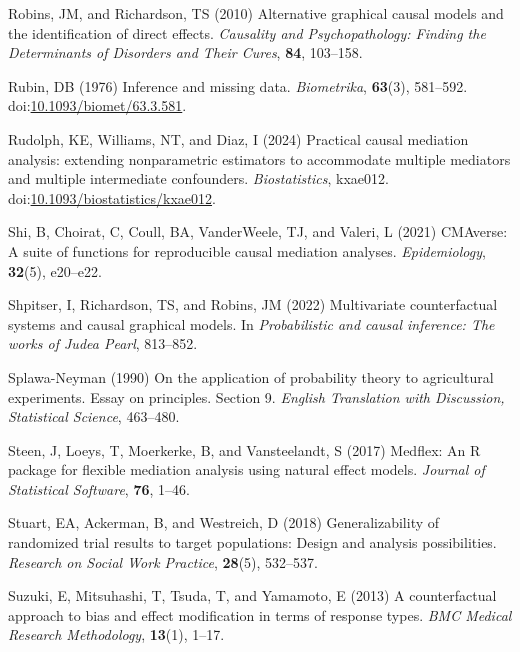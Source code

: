 \documentclass[
  single column]{article}
\newlength{\cslhangindent}
\newenvironment{CSLReferences}[2] %
 {\begin{list}{}{%
  \setlength{\itemindent}{0pt}
  \setlength{\leftmargin}{0pt}
  \setlength{\parsep}{0pt}
  \ifodd #1
   \setlength{\leftmargin}{\cslhangindent}
   \setlength{\itemindent}{-1\cslhangindent}
  \fi
  \setlength{\itemsep}{#2\baselineskip}}}
 {\end{list}}
\begin{document}
\begin{CSLReferences}{1}{0}
Robins, JM, and Richardson, TS (2010) Alternative graphical causal
models and the identification of direct effects. \emph{Causality and
Psychopathology: Finding the Determinants of Disorders and Their Cures},
\textbf{84}, 103--158.

Rubin, DB (1976) Inference and missing data. \emph{Biometrika},
\textbf{63}(3), 581--592.
doi:\href{https://doi.org/10.1093/biomet/63.3.581}{10.1093/biomet/63.3.581}.

Rudolph, KE, Williams, NT, and Diaz, I (2024) {Practical causal
mediation analysis: extending nonparametric estimators to accommodate
multiple mediators and multiple intermediate confounders}.
\emph{Biostatistics}, kxae012.
doi:\href{https://doi.org/10.1093/biostatistics/kxae012}{10.1093/biostatistics/kxae012}.

Shi, B, Choirat, C, Coull, BA, VanderWeele, TJ, and Valeri, L (2021)
CMAverse: A suite of functions for reproducible causal mediation
analyses. \emph{Epidemiology}, \textbf{32}(5), e20--e22.

Shpitser, I, Richardson, TS, and Robins, JM (2022) Multivariate
counterfactual systems and causal graphical models. In
\emph{Probabilistic and causal inference: The works of {J}udea {P}earl},
813--852.

Splawa-Neyman (1990) On the application of probability theory to
agricultural experiments. Essay on principles. Section 9. \emph{English
Translation with Discussion, Statistical Science}, 463--480.

Steen, J, Loeys, T, Moerkerke, B, and Vansteelandt, S (2017) Medflex: An
{R} package for flexible mediation analysis using natural effect models.
\emph{Journal of Statistical Software}, \textbf{76}, 1--46.

Stuart, EA, Ackerman, B, and Westreich, D (2018) Generalizability of
randomized trial results to target populations: Design and analysis
possibilities. \emph{Research on Social Work Practice}, \textbf{28}(5),
532--537.

Suzuki, E, Mitsuhashi, T, Tsuda, T, and Yamamoto, E (2013) A
counterfactual approach to bias and effect modification in terms of
response types. \emph{BMC Medical Research Methodology}, \textbf{13}(1),
1--17.


\end{CSLReferences}
\end{document}
